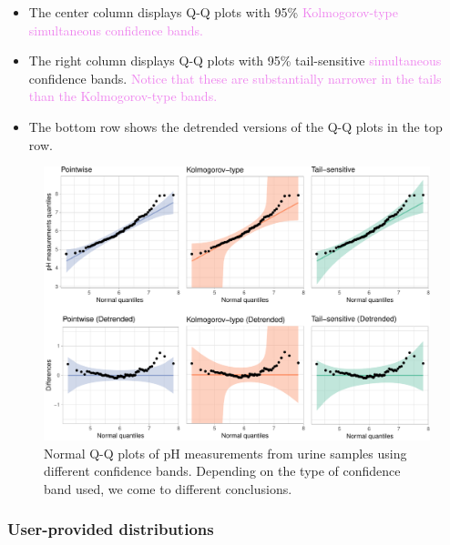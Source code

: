 \begin{itemize}
\item
  The center column displays Q-Q plots with 95\%
  {\textcolor{violet}{Kolmogorov-type simultaneous confidence bands.}}
\item
  The right column displays Q-Q plots with 95\% tail-sensitive
  {\textcolor{violet}{simultaneous}} confidence bands.
  {\textcolor{violet}{Notice that these are substantially narrower in the tails than the Kolmogorov-type bands.}}
\item
  The bottom row shows the detrended versions of the Q-Q plots in the
  top row.
\end{itemize}

\begin{Schunk}
\begin{figure}

{\centering \includegraphics[width=\textwidth]{loy-figures/urine-qq-bands-1} 

}

\caption[Normal Q-Q plots of pH measurements from urine samples using different confidence bands]{Normal Q-Q plots of pH measurements from urine samples using different confidence bands. Depending on the type of confidence band used, we come to different conclusions.}\label{fig:urine-qq-bands}
\end{figure}
\end{Schunk}

\FloatBarrier

\hypertarget{user-provided-distributions}{%
\subsubsection{User-provided
distributions}\label{user-provided-distributions}}

